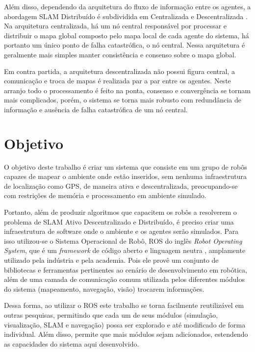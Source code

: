 Além disso, dependendo da arquitetura do fluxo de informação entre os agentes, 
a abordagem SLAM Distribuído é subdividida em Centralizada e Descentralizada \cite[p.~1316]{cadena2016past}. Na arquitetura centralizada, há um nó central 
responsável por processar e distribuir o mapa global composto 
pelo mapa local de cada agente do sistema, há portanto um único ponto de falha 
catastrófica, o nó central. Nessa arquitetura é geralmente mais simples manter 
consistência e consenso sobre o mapa global. 

Em contra partida, a arquitetura descentralizada não possui figura central, a 
comunicação e troca de mapas é realizada par a par entre os agentes. Neste arranjo 
todo o processamento é feito na ponta, consenso e convergência se tornam mais 
complicados, porém, o sistema se torna mais robusto com redundância de 
informação e ausência de falha catastrófica de um nó central.


\section{Objetivo}
O objetivo deste trabalho é criar um sistema que consiste em um grupo de 
robôs capazes de mapear o ambiente onde estão inseridos, sem nenhuma infraestrutura de localização como GPS, de maneira ativa e 
descentralizada, preocupando-se com restrições de memória e processamento em 
ambiente simulado.

Portanto, além de produzir algoritmos que capacitem os robôs a resolverem o 
problema de SLAM Ativo Descentralizado e Distribuído, é preciso criar uma 
infraestrutura de software onde o ambiente e os agentes serão simulados. Para 
isso utilizou-se o Sistema Operacional de Robô, ROS do inglês \textit{Robot 
Operating System}, que é um \textit{framework} de código aberto e linguagem 
neutra \cite{quigley2009ros}, amplamente utilizado pela indústria e pela 
academia. Pois ele provê um conjunto de bibliotecas e ferramentas pertinentes 
ao cenário de desenvolvimento em robótica, além de uma camada de comunicação 
comum utilizada pelos diferentes módulos do sistema (mapeamento, navegação, 
visão) trocarem informações.

Dessa forma, ao utilizar o ROS este trabalho se torna facilmente reutilizável 
em outras pesquisas, permitindo que cada um de seus módulos 
(simulação, visualização, SLAM e navegação) possa ser explorado e até 
modificado de forma individual. Além disso, permite que mais módulos sejam 
adicionados, estendendo as capacidades do sistema aqui desenvolvido.


